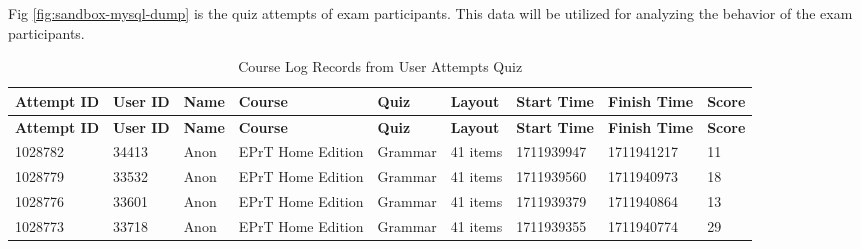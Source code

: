 Fig \ref{fig:sandbox-mysql-dump} is the quiz attempts of exam participants. This data will be utilized for analyzing the behavior of the exam participants.


\begin{longtable}{|p{1.3cm}|p{1.5cm}|p{1.2cm}|p{2.1cm}|p{1.5cm}|p{1.5cm}|p{1.8cm}|p{1.8cm}|p{0.8cm}|}
	\caption{Course Log Records from User Attempts Quiz} \label{tab:quiz-attempts-log} \\
	\hline
	\textbf{Attempt ID} & \textbf{User ID} & \textbf{Name} & \textbf{Course} & \textbf{Quiz} & \textbf{Layout} & \textbf{Start Time} & \textbf{Finish Time} & \textbf{Score} \\
	\hline
	\endfirsthead
	
	\hline
	\textbf{Attempt ID} & \textbf{User ID} & \textbf{Name} & \textbf{Course} & \textbf{Quiz} & \textbf{Layout} & \textbf{Start Time} & \textbf{Finish Time} & \textbf{Score} \\
	\hline
	\endhead
	
	1028782 & 34413 & Anon & EPrT Home Edition & Grammar & 41 items & 1711939947 & 1711941217 & 11 \\
	\hline
	1028779 & 33532 & Anon & EPrT Home Edition & Grammar & 41 items & 1711939560 & 1711940973 & 18 \\
	\hline
	1028776 & 33601 & Anon & EPrT Home Edition & Grammar & 41 items & 1711939379 & 1711940864 & 13 \\
	\hline
	1028773 & 33718 & Anon & EPrT Home Edition & Grammar & 41 items & 1711939355 & 1711940774 & 29 \\
	\hline
	
\end{longtable}

